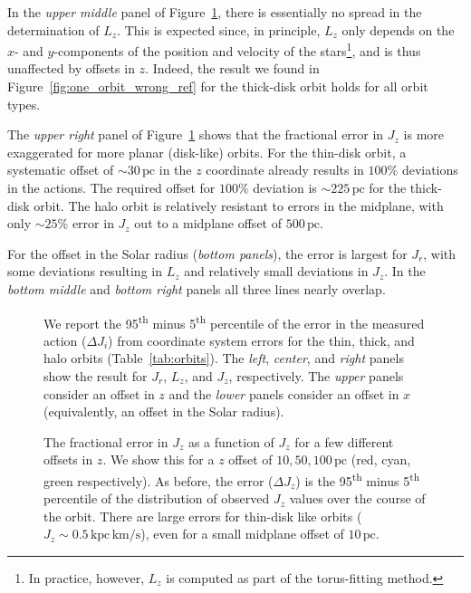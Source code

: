 \documentclass[twocolumn]{aastex62}
\newcommand{\pc}{\text{pc}}
\newcommand{\kms}{\text{km}/\text{s}}
\newcommand{\actunit}{\text{kpc}\,\kms}
\newcommand{\uth}{\textsuperscript{th}}
\begin{document}
In the {\em upper middle} panel of Figure~\ref{fig:many_orbit_wrong_ref},
there is essentially no spread in the determination of $L_z$. This is expected
since, in principle, $L_z$ only depends on the $x$- and $y$-components of the
position and velocity of the stars\footnote{In practice, however, $L_z$ is
computed as part of the torus-fitting method.}, and is thus unaffected by
offsets in $z$. Indeed, the result we found in
Figure~\ref{fig:one_orbit_wrong_ref} for the thick-disk orbit holds for all
orbit types.
 
The {\em upper right} panel of Figure~\ref{fig:many_orbit_wrong_ref} shows
that the fractional error in $J_z$ is more exaggerated for more planar
(disk-like) orbits. For the thin-disk orbit, a systematic offset of
$\sim30\,\pc$ in the $z$ coordinate already results in $100\%$ deviations in
the actions. The required offset for $100\%$ deviation is $\sim225\,\pc$ for
the thick-disk orbit. The halo orbit is relatively resistant to errors in the
midplane, with only $\sim25\%$ error in $J_z$ out to a midplane offset of
$500\,\pc$.

For the offset in the Solar radius ({\em bottom panels}), the error is largest
for $J_r$, with some deviations resulting in $L_z$ and relatively small
deviations in $J_z$. In the {\em bottom middle} and {\em bottom right} panels
all three lines nearly overlap.

\begin{figure}
\caption{We report the 95\uth{} minus 5\uth{} percentile of the error in the
measured action ($\Delta J_i$) from coordinate system errors for the thin,
thick, and halo orbits (Table~\ref{tab:orbits}). The {\em left}, {\em center},
and {\em right} panels show the result for $J_r$, $L_z$, and $J_z$,
respectively. The {\em upper} panels consider an offset in $z$ and the {\em
lower} panels consider an offset in $x$ (equivalently, an offset in the Solar
radius).}
\label{fig:many_orbit_wrong_ref}
\end{figure}

\begin{figure}
\caption{The fractional error in $J_z$ as a function of $J_z$ for a few
different offsets in $z$. We show this for a $z$ offset of $10, 50, 100\,\pc$
(red, cyan, green respectively). As before, the error ($\Delta J_z$) is the
95\uth{} minus 5\uth{} percentile of the distribution of observed $J_z$ values
over the course of the orbit. There are large errors for thin-disk like orbits
($J_z \sim 0.5\,\actunit$), even for a small midplane offset of $10\,\pc$. }
\label{fig:dJz_fun_Jz}
\end{figure}
\end{document}
